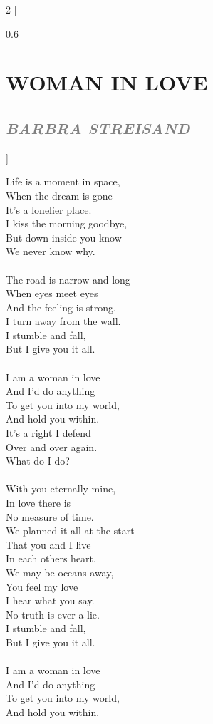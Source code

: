 \documentclass[100pt,a4paper]{report}
\newenvironment{song2}[2]
	{	
    	\begin{multicols*}{2}
		[
			\begin{spacing}{0.6}
				\section*{\LARGE\centering \MakeUppercase{\textbf{{#1}}}}
				\subsection*{\Large\centering \textit{\textcolor{gray}{\MakeUppercase{{#2}}}}}
			\end{spacing}
		]
		\Large
	}
	{
	\end{multicols*}
	\newpage
    }
\begin{document}
\begin{song2}{Woman in Love}{Barbra Streisand}
\noindent
Life is a moment in space,\\
When the dream is gone\\
It's a lonelier place.\\
I kiss the morning goodbye,\\
But down inside you know\\
We never know why.\\
\\
The road is narrow and long\\
When eyes meet eyes\\
And the feeling is strong.\\
I turn away from the wall.\\
I stumble and fall,\\
But I give you it all.\\
\\
I am a woman in love\\
And I'd do anything\\
To get you into my world,\\
And hold you within.\\
It's a right I defend\\
Over and over again.\\
What do I do?\\
\\
With you eternally mine,\\
In love there is\\
No measure of time.\\
We planned it all at the start\\
That you and I live\\
In each others heart.\\
\vfill
\columnbreak
\noindent
We may be oceans away,\\
You feel my love\\
I hear what you say.\\
No truth is ever a lie.\\
I stumble and fall,\\
But I give you it all.\\
\\
I am a woman in love\\
And I'd do anything\\
To get you into my world,\\
And hold you within.\\

\end{song2}
\end{document}

